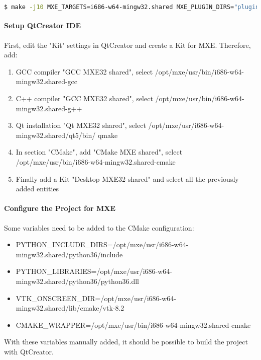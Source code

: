 \begin{lstlisting}[language=bash]
$ make -j10 MXE_TARGETS=i686-w64-mingw32.shared MXE_PLUGIN_DIRS="plugins/gcc10 plugins/boost_1_66_0" pe-util cgal gettext gcc glew glfw3 mesa harfbuzz armadillo boost dxflib freetype libgcrypt glib gsl hdf5 libiconv libidn libidn2 vtk oce openssl jpeg qt5 cryptopp poppler libntlm openssl wt tiff libgsasl
\end{lstlisting}


\paragraph{Setup QtCreator IDE}

First, edit the "Kit" settings in QtCreator and create a Kit for MXE.
Therefore, add:
\begin{enumerate}
\item GCC compiler "GCC MXE32 shared", select /opt/mxe/usr/bin/i686-w64-mingw32.shared-gcc
\item C++ compiler "GCC MXE32 shared", select /opt/mxe/usr/bin/i686-w64-mingw32.shared-g++
\item Qt installation "Qt MXE32 shared", select /opt/mxe/usr/i686-w64-mingw32.shared/qt5/bin/
qmake
\item In section "CMake", add "CMake MXE shared", select /opt/mxe/usr/bin/i686-w64-mingw32.shared-cmake
\item Finally add a Kit "Desktop MXE32 shared" and select all the previously added entities
\end{enumerate}

\paragraph{Configure the Project for MXE}

Some variables need to be added to the CMake configuration:
\begin{itemize}
\item PYTHON\_INCLUDE\_DIRS=/opt/mxe/usr/i686-w64-mingw32.shared/python36/include
\item PYTHON\_LIBRARIES=/opt/mxe/usr/i686-w64-mingw32.shared/python36/python36.dll
\item VTK\_ONSCREEN\_DIR=/opt/mxe/usr/i686-w64-mingw32.shared/lib/cmake/vtk-8.2
\item CMAKE\_WRAPPER=/opt/mxe/usr/bin/i686-w64-mingw32.shared-cmake
\end{itemize}

With these variables manually added, it should be possible to build the project with QtCreator.

